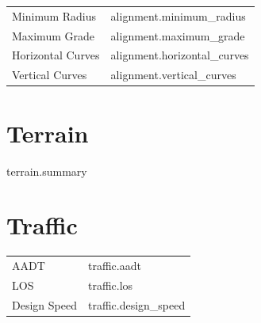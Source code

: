 \documentclass[11pt,a4paper]{article}
\begin{document}
{{{\begin{tabular}{ll}
\\

Minimum Radius &
{{ alignment.minimum_radius }}

\\

Maximum Grade &
{{ alignment.maximum_grade }}

\\

Horizontal Curves &
{{ alignment.horizontal_curves }}

\\

Vertical Curves &
{{ alignment.vertical_curves }}

\\

\end{tabular}

{%


{%

\section{Terrain}

{{ terrain.summary }}

{%


{%

\section{Traffic}

\begin{tabular}{ll}

AADT &
{{ traffic.aadt }}

\\

LOS &
{{ traffic.los }}

\\

Design Speed &
{{ traffic.design_speed }}

\\

\end{tabular}

}}}}}}}
\end{document}
